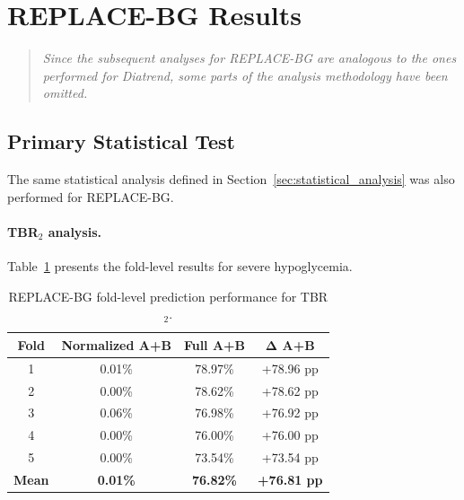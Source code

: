 
\section{REPLACE-BG Results}
\label{sec:replacebg_results}

\begin{quote}
\small
\textit{Since the subsequent analyses for REPLACE-BG are analogous to the ones performed for Diatrend, some parts of the analysis methodology have been omitted.}
\end{quote}

\subsection{Primary Statistical Test}
\label{subsec:replacebg_primary_analysis}

The same statistical analysis defined in Section~\ref{sec:statistical_analysis} was also performed for REPLACE-BG.

\paragraph{TBR$_2$ analysis.}

Table~\ref{tab:replacebg_fold_tbr2_effect} presents the fold-level results for severe hypoglycemia.

\begin{table}[htbp]
    \centering
    \caption{REPLACE-BG fold-level prediction performance for TBR$_2$.}
    \label{tab:replacebg_fold_tbr2_effect}
    \begin{tabular}{cccc}
        \toprule
        \textbf{Fold}
        & \textbf{Normalized A+B}
        & \textbf{Full A+B}
        & \(\boldsymbol{\Delta}\) \textbf{A+B} \\
        \midrule
        1 & 0.01\% & 78.97\% & +78.96 pp \\
        2 & 0.00\% & 78.62\% & +78.62 pp \\
        3 & 0.06\% & 76.98\% & +76.92 pp \\
        4 & 0.00\% & 76.00\% & +76.00 pp \\
        5 & 0.00\% & 73.54\% & +73.54 pp \\
        \midrule
        \textbf{Mean}
        & \textbf{0.01\%}
        & \textbf{76.82\%}
        & \textbf{+76.81 pp} \\
        \bottomrule
    \end{tabular}
\end{table}

